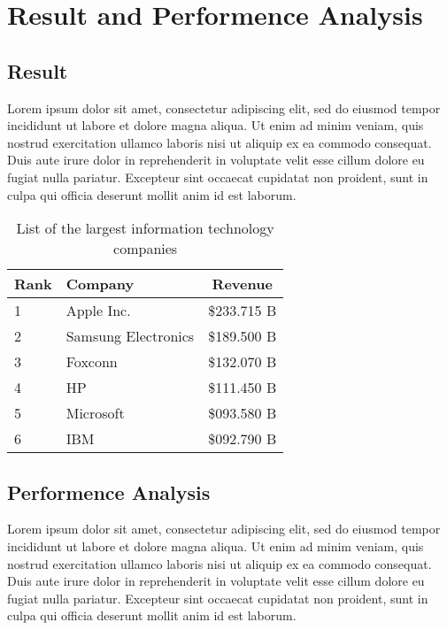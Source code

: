 \documentclass[document.tex]{subfiles}
\begin{document}
\chapter{Result and Performence Analysis}

\section{Result}

\noindent Lorem ipsum dolor sit amet, consectetur adipiscing elit, sed do eiusmod tempor incididunt ut labore et dolore magna aliqua. Ut enim ad minim veniam, quis nostrud exercitation ullamco laboris nisi ut aliquip ex ea commodo consequat. Duis aute irure dolor in reprehenderit in voluptate velit esse cillum dolore eu fugiat nulla pariatur. Excepteur sint occaecat cupidatat non proident, sunt in culpa qui officia deserunt mollit anim id est laborum.\newline

\begin{table}[H]
        \caption{List of the largest information technology companies}
        \begin{center}
                \begin{tabular}{|l|l|c|}\hline
                        Rank & Company             & Revenue     \\ \hline
                        1    & Apple Inc.          & \$233.715 B \\ \hline
                        2    & Samsung Electronics & \$189.500 B \\ \hline
                        3    & Foxconn             & \$132.070 B \\ \hline
                        4    & HP                  & \$111.450 B \\ \hline
                        5    & Microsoft           & \$093.580 B \\ \hline
                        6    & IBM                 & \$092.790 B \\ \hline
                \end{tabular}
        \end{center}
        \label{tab:result}
\end{table}

\section{Performence Analysis}
\noindent Lorem ipsum dolor sit amet, consectetur adipiscing elit, sed do eiusmod tempor incididunt ut labore et dolore magna aliqua. Ut enim ad minim veniam, quis nostrud exercitation ullamco laboris nisi ut aliquip ex ea commodo consequat. Duis aute irure dolor in reprehenderit in voluptate velit esse cillum dolore eu fugiat nulla pariatur. Excepteur sint occaecat cupidatat non proident, sunt in culpa qui officia deserunt mollit anim id est laborum.
\end{document}
